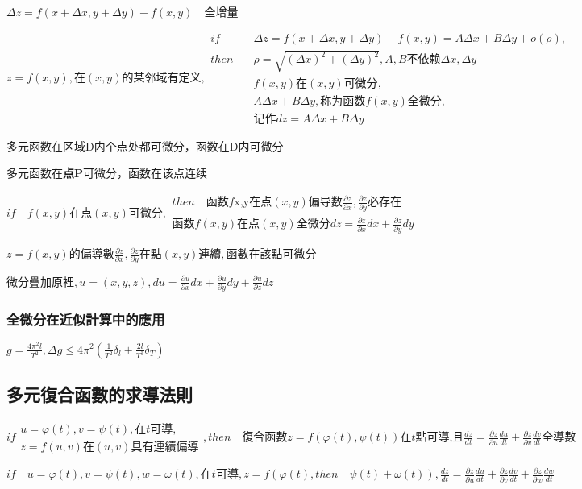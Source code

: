 \documentclass[UTF8]{ctexart}
\newcommand{\mt}[1]{\text{#1}}
\newcommand{\mb}[1]{\textbf{#1}}
\newcommand{\md}[1]{\displaystyle{#1}}
\newcommand{\mf}[1]{\left( #1\right)}
\newcommand{\q}{\quad}
\newcommand{\qa}{\vspace{12 pt}}
\newcommand{\p}{\par}
\newcommand{\ma}[1]{\begin{array}{llll} #1 \end{array}}
\begin{document}
$\Delta z=f\mf{x+ \Delta x,y+\Delta y}-f\mf{x,y} \q \mt{全增量}$\p

$z=f\mf{x,y},\mt{在}\mf{x,y}\mt{的某邻域有定义},\ma{if \q  &\Delta z=f\mf{x+ \Delta x,y+\Delta y}-f\mf{x,y}=A\Delta x +B\Delta  y+ o\mf{\rho},\\
then \q 
 &\rho=\sqrt{\mf{\Delta x}^2+\mf{\Delta y}^2},A,B\mt{不依赖}\Delta x ,\Delta y\\
 &f\mf{x,y}\mt{在}\mf{x,y}\mt{可微分},\\
 &A\Delta x +B\Delta  y ,\mt{称为函数}f\mf{x,y}\mt{全微分},\\
 &\mt{记作}dz=A\Delta x +B\Delta  y
}$\p

多元函数在区域D内个点处都可微分，函数在D内可微分\p
多元函数在\mb{点P}可微分，函数在该点连续\p


$if \q f\mf{x,y}\mt{在点} \mf{x,y} \mt{可微分},\ma{
    then \q  \mt{函数}f\mt{x,y}  \mt{在点}\mf{x,y}\mt{偏导数} \frac{\partial z}{\partial x},\frac{\partial z}{\partial y} \mt{必存在}\\
    \mt{函数}f\mf{x,y}  \mt{在点}\mf{x,y}\mt{全微分} dz=\frac{\partial z}{\partial x}dx+\frac{\partial z}{\partial y}dy
}$\p

$z=f\mf{x,y}\mt{的偏導數}\frac{\partial z}{\partial x},\frac{\partial z}{\partial y}\mt{在點}\mf{x,y}\mt{連續},\mt{函數在該點可微分} $\p

$\mt{微分疊加原裡},u=\mf{x,y,z},du=\frac{\partial u}{\partial x}dx+\frac{\partial u}{\partial y}dy+\frac{\partial u}{\partial z}dz$\p


\subsubsection{全微分在近似計算中的應用}

$g=\frac{4\pi^2l}{T^2},\Delta g\leqslant 4\pi^2\mf{\frac{1}{T^2}\delta_l  +\frac{2l}{T^3}\delta_T}$\p


\subsection{多元復合函數的求導法則}

$if \ma{
    u=\varphi\mf{t},v=\psi\mf{t},\mt{在}t\mt{可導},\\
    z=f\mf{u,v}\mt{在}\mf{u,v}\mt{具有連續偏導}
},then \q \mt{復合函數}z=f\mf{\varphi\mf{t},\psi\mf{t}}\mt{在}t\mt{點可導,且}\md{\frac{dz}{dt}=\frac{\partial z}{\partial u}\frac{du}{dt}+\frac{\partial z}{\partial v}\frac{dv}{dt}}\mt{全導數}$\p
\qa

$if \q u=\varphi\mf{t},v=\psi\mf{t} ,w=\omega\mf{t},\mt{在}t\mt{可導} , z=f\mf{\varphi\mf{t},then \q \psi\mf{t}+\omega\mf{t}},\md{\frac{dz}{dt}=\frac{\partial z}{\partial u}\frac{du}{dt}+\frac{\partial z}{\partial v}\frac{dv}{dt}+\frac{\partial z}{\partial w}\frac{dw}{dt}}$\p
\qa
\end{document}
